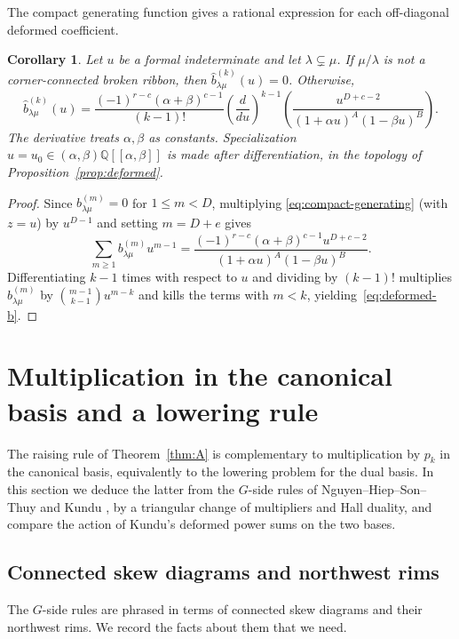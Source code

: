 \documentclass[11pt]{amsart}
\numberwithin{equation}{section}
\newtheorem{corollary}[theorem]{Corollary}
\theoremstyle{definition}
\theoremstyle{remark}
\newcommand{\QQ}{\mathbb Q}
\begin{document}
The compact generating function gives a rational expression
for each off-diagonal deformed coefficient.

\begin{corollary}
\label{cor:deformed-rational}
Let $u$ be a formal indeterminate and let $\lambda\subsetneq\mu$.
If $\mu/\lambda$ is not a corner-connected broken ribbon, then
$\widehat b^{(k)}_{\lambda\mu}(u)=0$. Otherwise,
\[
 \widehat b^{(k)}_{\lambda\mu}(u)
 =\frac{(-1)^{r-c}(\alpha+\beta)^{c-1}}{(k-1)!}
 \left(\frac{d}{du}\right)^{k-1}
 \left(
 \frac{u^{D+c-2}}{(1+\alpha u)^A(1-\beta u)^B}
 \right).
\]
The derivative treats $\alpha,\beta$ as constants. Specialization
$u=u_0\in(\alpha,\beta)\QQ[[\alpha,\beta]]$ is made after
differentiation, in the topology of Proposition~\ref{prop:deformed}.
\end{corollary}

\begin{proof}
Since $b^{(m)}_{\lambda\mu}=0$ for $1\leq m<D$, multiplying
\eqref{eq:compact-generating} (with $z=u$) by $u^{D-1}$ and setting $m=D+e$
gives
\[
 \sum_{m\geq1}b^{(m)}_{\lambda\mu}u^{m-1}
 =\frac{(-1)^{r-c}(\alpha+\beta)^{c-1}u^{D+c-2}}
 {(1+\alpha u)^A(1-\beta u)^B}.
\]
Differentiating $k-1$ times with respect to $u$ and dividing by $(k-1)!$
multiplies $b^{(m)}_{\lambda\mu}$ by $\binom{m-1}{k-1}u^{m-k}$ and kills the
terms with $m<k$, yielding~\eqref{eq:deformed-b}.
\end{proof}

\section{Multiplication in the canonical basis and a lowering rule}
\label{sec:lowering} The raising rule of Theorem~\ref{thm:A} is complementary to multiplication
by $p_k$ in the canonical basis, equivalently to the lowering problem for
the dual basis. In this section we deduce the latter from the $G$-side
rules of Nguyen--Hiep--Son--Thuy \cite{NHST} and Kundu \cite{Kundu}, by a
triangular change of multipliers and Hall duality, and compare the action
of Kundu's deformed power sums on the two bases.

\subsection{Connected skew diagrams and northwest rims}

The $G$-side rules are phrased in terms of connected skew diagrams and
their northwest rims. We record the facts about them that we need.
\end{document}
